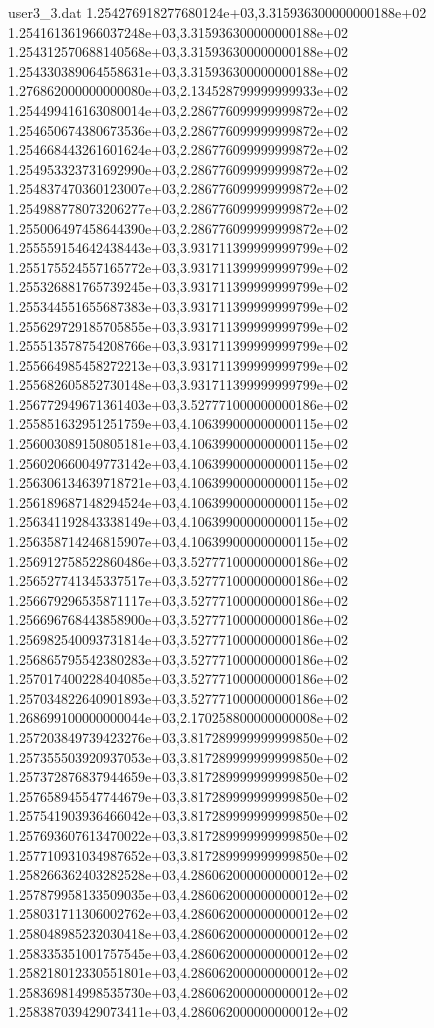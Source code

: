 \begin{filecontents}{user3_3.dat}
1.254276918277680124e+03,3.315936300000000188e+02
1.254161361966037248e+03,3.315936300000000188e+02
1.254312570688140568e+03,3.315936300000000188e+02
1.254330389064558631e+03,3.315936300000000188e+02
1.276862000000000080e+03,2.134528799999999933e+02
1.254499416163080014e+03,2.286776099999999872e+02
1.254650674380673536e+03,2.286776099999999872e+02
1.254668443261601624e+03,2.286776099999999872e+02
1.254953323731692990e+03,2.286776099999999872e+02
1.254837470360123007e+03,2.286776099999999872e+02
1.254988778073206277e+03,2.286776099999999872e+02
1.255006497458644390e+03,2.286776099999999872e+02
1.255559154642438443e+03,3.931711399999999799e+02
1.255175524557165772e+03,3.931711399999999799e+02
1.255326881765739245e+03,3.931711399999999799e+02
1.255344551655687383e+03,3.931711399999999799e+02
1.255629729185705855e+03,3.931711399999999799e+02
1.255513578754208766e+03,3.931711399999999799e+02
1.255664985458272213e+03,3.931711399999999799e+02
1.255682605852730148e+03,3.931711399999999799e+02
1.256772949671361403e+03,3.527771000000000186e+02
1.255851632951251759e+03,4.106399000000000115e+02
1.256003089150805181e+03,4.106399000000000115e+02
1.256020660049773142e+03,4.106399000000000115e+02
1.256306134639718721e+03,4.106399000000000115e+02
1.256189687148294524e+03,4.106399000000000115e+02
1.256341192843338149e+03,4.106399000000000115e+02
1.256358714246815907e+03,4.106399000000000115e+02
1.256912758522860486e+03,3.527771000000000186e+02
1.256527741345337517e+03,3.527771000000000186e+02
1.256679296535871117e+03,3.527771000000000186e+02
1.256696768443858900e+03,3.527771000000000186e+02
1.256982540093731814e+03,3.527771000000000186e+02
1.256865795542380283e+03,3.527771000000000186e+02
1.257017400228404085e+03,3.527771000000000186e+02
1.257034822640901893e+03,3.527771000000000186e+02
1.268699100000000044e+03,2.170258800000000008e+02
1.257203849739423276e+03,3.817289999999999850e+02
1.257355503920937053e+03,3.817289999999999850e+02
1.257372876837944659e+03,3.817289999999999850e+02
1.257658945547744679e+03,3.817289999999999850e+02
1.257541903936466042e+03,3.817289999999999850e+02
1.257693607613470022e+03,3.817289999999999850e+02
1.257710931034987652e+03,3.817289999999999850e+02
1.258266362403282528e+03,4.286062000000000012e+02
1.257879958133509035e+03,4.286062000000000012e+02
1.258031711306002762e+03,4.286062000000000012e+02
1.258048985232030418e+03,4.286062000000000012e+02
1.258335351001757545e+03,4.286062000000000012e+02
1.258218012330551801e+03,4.286062000000000012e+02
1.258369814998535730e+03,4.286062000000000012e+02
1.258387039429073411e+03,4.286062000000000012e+02

\end{filecontents}
